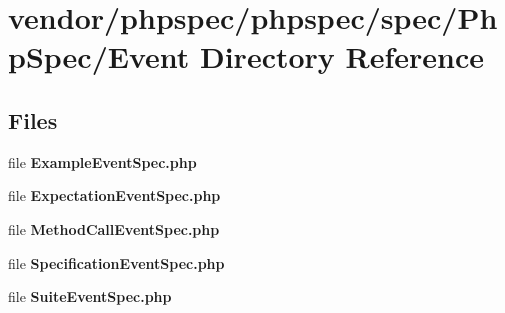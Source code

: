 \section{vendor/phpspec/phpspec/spec/\+Php\+Spec/\+Event Directory Reference}
\label{dir_475d2041e792c5a22e10b0c0e0343598}
\subsection*{Files}
\begin{DoxyCompactItemize}
\item 
file {\bf Example\+Event\+Spec.\+php}
\item 
file {\bf Expectation\+Event\+Spec.\+php}
\item 
file {\bf Method\+Call\+Event\+Spec.\+php}
\item 
file {\bf Specification\+Event\+Spec.\+php}
\item 
file {\bf Suite\+Event\+Spec.\+php}
\end{DoxyCompactItemize}
